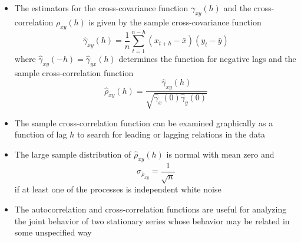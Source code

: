 \documentclass[12pt]{article}
\begin{document}
\begin{itemize}
\item The estimators for the cross-covariance function $\gamma_{xy}(h)$ and the cross-correlation $\rho_{xy}(h)$ is given by the sample cross-covariance function $$ \hat{\gamma}_{xy}(h) = \frac{1}{n}\sum_{t=1}^{n-h} (x_{t+h} - \bar{x})(y_t - \bar{y})$$ where $\hat{\gamma}_{xy}(-h) = \hat{\gamma}_{yx}(h)$ determines the function for negative lags and the sample cross-correlation function $$ \hat{\rho}_{xy}(h) = \frac{\hat{\gamma}_{xy}(h)}{\sqrt{\hat{\gamma}_x(0)\hat{\gamma}_y(0)}} $$ 
\item The sample cross-correlation function can be examined graphically as a function of lag $h$ to search for leading or lagging relations in the data 
\item The large sample distribution of $\hat{\rho}_{xy}(h)$ is normal with mean zero and $$ \sigma_{\hat{\rho}_{xy}} = \frac{1}{\sqrt{n}} $$ if at least one of the processes is independent white noise 
\item The autocorrelation and cross-correlation functions are useful for analyzing the joint behavior of two stationary series whose behavior may be related in some unspecified way 
\end{itemize}
\end{document}
